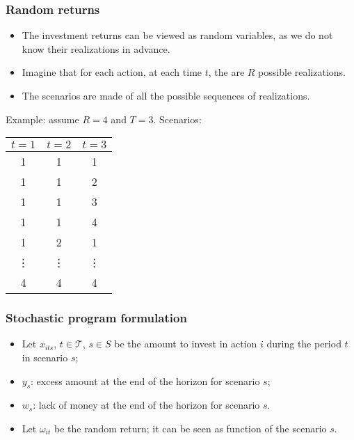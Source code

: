 \documentclass{beamer}
\begin{document}
\begin{frame}
\frametitle{Random returns}

\begin{itemize}
\item
The investment returns can be viewed as random variables, as we do not know their realizations in advance.
\item
Imagine that for each action, at each time $t$, the are $R$ possible realizations.
\item
The scenarios are made of all the possible sequences of realizations.
\end{itemize}

Example: assume $R = 4$ and $T = 3$. Scenarios:
\begin{small}
\begin{center}
\begin{tabular}{ccc}
\hline
$t = 1$ & $t = 2$ & $t = 3$ \\
\hline
1 & 1 & 1 \\
1 & 1 & 2 \\
1 & 1 & 3 \\
1 & 1 & 4 \\
1 & 2 & 1 \\
\vdots & \vdots & \vdots \\
4 & 4 & 4 \\
\end{tabular}
\end{center}
\end{small}

\end{frame}

\begin{frame}
\frametitle{Stochastic program formulation}

\begin{itemize}
\item
Let $x_{its}$, $t \in \mathcal{T}$, $s \in S$ be the amount to invest in action $i$ during the period $t$ in scenario $s$;
\item
$y_s$: excess amount at the end of the horizon for scenario $s$;
\item
$w_s$: lack of money at the end of the horizon for scenario $s$.
\item
Let $\omega_{it}$ be the random return; it can be seen as function of the scenario $s$.
\end{itemize}

\end{frame}
\end{document}
